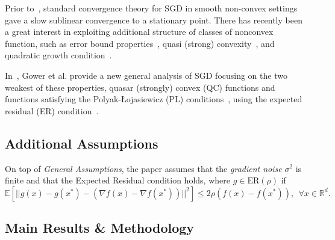 \documentclass{article}
\begin{document}
Prior to~\cite{https://doi.org/10.48550/arxiv.2006.10311}, standard convergence theory for SGD in smooth non-convex settings gave a slow sublinear convergence to a stationary point. There has recently been a great interest
in exploiting additional structure of classes of nonconvex function, such as error bound properties~\cite{Fabian2010ErrorBN},
quasi (strong) convexity~\cite{https://doi.org/10.48550/arxiv.1906.11985, JMLR:v19:16-465, https://doi.org/10.48550/arxiv.1710.00797}, and quadratic growth condition~\cite{doi:10.1137/S1052623499359178}.

In~\cite{https://doi.org/10.48550/arxiv.2006.10311}, Gower et al. provide a new general analysis of SGD focusing on the two weakest of these properties, quasar (strongly) convex (QC) functions and functions satisfying the
Polyak-Łojasiewicz (PL) conditions~\cite{POLYAK1963864}, using the expected residual (ER) condition~\cite{Gower2021StochasticQM}.

\subsection{Additional Assumptions}

On top of \textit{General Assumptions}, the paper assumes that the \textit{gradient noise} $\sigma^2$ is finite and that the Expected Residual condition holds, where $g\in\text{ER}(\rho)$ if
\begin{equation}
	\mathbb{E}\left[||g(x) - g(x^*) - (\nabla f(x) - \nabla f(x^*))||^2\right] \leq 2\rho (f(x) - f(x^*)), \ \ \forall x\in\mathbb{R}^d.
\end{equation}

\subsection{Main Results \& Methodology}
\end{document}

